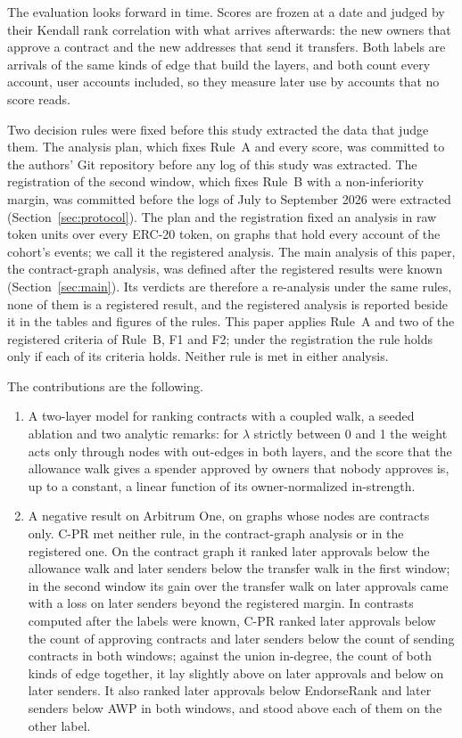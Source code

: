 \documentclass{ieeeaccess}
\newcommand{\cpr}{\mbox{C-PR}}
\begin{document}
The evaluation looks forward in time. Scores are frozen at a date and judged by their Kendall rank correlation \cite{kendall1938rank} with what arrives afterwards: the new owners that approve a contract and the new addresses that send it transfers. Both labels are arrivals of the same kinds of edge that build the layers, and both count every account, user accounts included, so they measure later use by accounts that no score reads.

Two decision rules were fixed before this study extracted the data that judge them. The analysis plan, which fixes Rule~A and every score, was committed to the authors' Git repository before any log of this study was extracted. The registration of the second window, which fixes Rule~B with a non-inferiority margin, was committed before the logs of July to September 2026 were extracted (Section~\ref{sec:protocol}). The plan and the registration fixed an analysis in raw token units over every ERC-20 token, on graphs that hold every account of the cohort's events; we call it the registered analysis. The main analysis of this paper, the contract-graph analysis, was defined after the registered results were known (Section~\ref{sec:main}). Its verdicts are therefore a re-analysis under the same rules, none of them is a registered result, and the registered analysis is reported beside it in the tables and figures of the rules. This paper applies Rule~A and two of the registered criteria of Rule~B, F1 and F2; under the registration the rule holds only if each of its criteria holds. Neither rule is met in either analysis.

The contributions are the following.
\begin{enumerate}
\item A two-layer model for ranking contracts with a coupled walk, a seeded ablation and two analytic remarks: for $\lambda$ strictly between 0 and 1 the weight acts only through nodes with out-edges in both layers, and the score that the allowance walk gives a spender approved by owners that nobody approves is, up to a constant, a linear function of its owner-normalized in-strength.
\item A negative result on Arbitrum One, on graphs whose nodes are contracts only. \cpr{} met neither rule, in the contract-graph analysis or in the registered one. On the contract graph it ranked later approvals below the allowance walk and later senders below the transfer walk in the first window; in the second window its gain over the transfer walk on later approvals came with a loss on later senders beyond the registered margin. In contrasts computed after the labels were known, \cpr{} ranked later approvals below the count of approving contracts and later senders below the count of sending contracts in both windows; against the union in-degree, the count of both kinds of edge together, it lay slightly above on later approvals and below on later senders. It also ranked later approvals below EndorseRank and later senders below AWP in both windows, and stood above each of them on the other label.
\end{enumerate}
\end{document}
